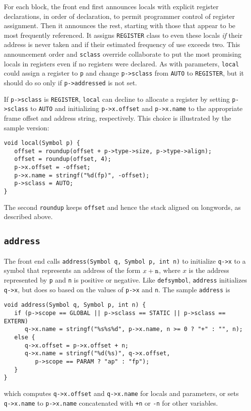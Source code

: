 For each block, the front end first announces locals with explicit
register declarations, in order of declaration, to permit programmer
control of register assignment. Then it announces the rest, starting
with those that appear to be most frequently referenced.  It assigns
\verb|REGISTER| class to even these locals {\em if} their address
is never taken and if their estimated frequency of use exceeds two.
This announcement order and \verb|sclass| override collaborate to put the most
promising locals in registers even if no registers were declared.  As
with parameters, \verb|local| could assign a register to \verb|p| and
change \verb|p->sclass| from \verb|AUTO| to \verb|REGISTER|, but it
should do so only if \verb|p->addressed| is not set.

If \verb|p->sclass| is \verb|REGISTER|, \verb|local|
can decline to allocate a register by setting \verb|p->sclass| to \verb|AUTO|
and initializing \verb|p->x.offset| and \verb|p->x.name| to the appropriate frame offset
and address string, respectively.
This choice is illustrated by the sample version:
\begin{verbatim}
void local(Symbol p) {
   offset = roundup(offset + p->type->size, p->type->align);
   offset = roundup(offset, 4);
   p->x.offset = -offset;
   p->x.name = stringf("%d(fp)", -offset);
   p->sclass = AUTO;
}
\end{verbatim}
The second \verb|roundup| keeps \verb|offset| and hence the stack
aligned on longwords, as described above.

\subsection{\tt address}

\label{address}
The front end calls \verb|address(Symbol q, Symbol p, int n)| to
initialize \verb|q->x| to a symbol that represents an address of the form $x+{\tt n}$,
where $x$ is the address represented by \verb|p| and \verb|n| is positive or negative.
Like \verb|defsymbol|, \verb|address| initializes \verb|q->x|, but
does so based on the values of \verb|p->x| and \verb|n|.
The sample \verb|address| is
\begin{verbatim}
void address(Symbol q, Symbol p, int n) {
   if (p->scope == GLOBAL || p->sclass == STATIC || p->sclass == EXTERN)
      q->x.name = stringf("%s%s%d", p->x.name, n >= 0 ? "+" : "", n);
   else {
      q->x.offset = p->x.offset + n;
      q->x.name = stringf("%d(%s)", q->x.offset,
         p->scope == PARAM ? "ap" : "fp");
   }
}
\end{verbatim}
which computes \verb|q->x.offset| and \verb|q->x.name| for locals and parameters,
or sets \verb|q->x.name| to \verb|p->x.name| concatenated with \verb|+n| or \verb|-n|
for other variables. 

